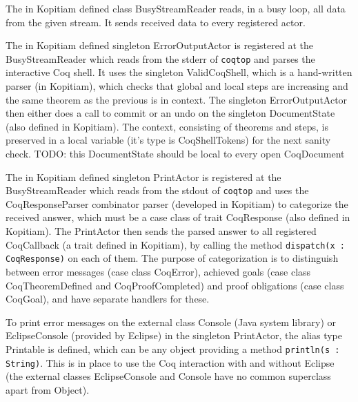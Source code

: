 \documentclass{article}
\begin{document}
The in Kopitiam defined class BusyStreamReader reads, in a busy loop, all data from the given stream. It sends received data to every registered actor.

The in Kopitiam defined singleton ErrorOutputActor is registered at the BusyStreamReader which reads from the stderr of \texttt{coqtop} and parses the interactive Coq shell. It uses the singleton ValidCoqShell, which is a hand-written parser (in Kopitiam), which checks that global and local steps are increasing and the same theorem as the previous is in context. The singleton ErrorOutputActor then either does a call to commit or an undo on the singleton DocumentState (also defined in Kopitiam). The context, consisting of theorems and steps, is preserved in a local variable (it's type is CoqShellTokens) for the next sanity check. TODO: this DocumentState should be local to every open CoqDocument

The in Kopitiam defined singleton PrintActor is registered at the BusyStreamReader which reads from the stdout of \texttt{coqtop} and uses the CoqResponseParser combinator parser (developed in Kopitiam) to categorize the received answer, which must be a case class of trait CoqResponse (also defined in Kopitiam). The PrintActor then sends the parsed answer to all registered CoqCallback (a trait defined in Kopitiam), by calling the method \texttt{dispatch(x : CoqResponse)} on each of them. The purpose of categorization is to distinguish between error messages (case class CoqError), achieved goals (case class CoqTheoremDefined and CoqProofCompleted) and proof obligations (case class CoqGoal), and have separate handlers for these.

To print error messages on the external class Console (Java system library) or EclipseConsole (provided by Eclipse) in the singleton PrintActor, the alias type Printable is defined, which can be any object providing a method \texttt{println(s : String)}. This is in place to use the Coq interaction with and without Eclipse (the external classes EclipseConsole and Console have no common superclass apart from Object).
\end{document}
